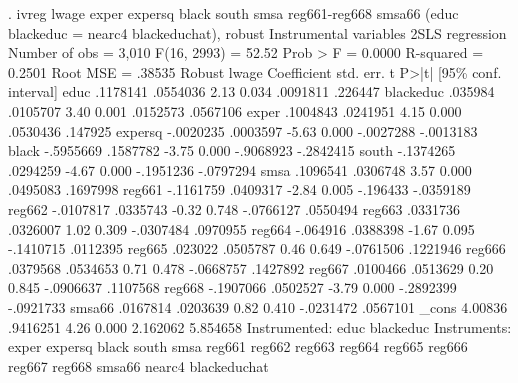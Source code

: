 . ivreg lwage exper expersq black south smsa reg661-reg668 smsa66 (educ blackeduc = nearc4 blackeduchat), robust
{\smallskip}
Instrumental variables 2SLS regression          Number of obs     =      3,010
                                                F(16, 2993)       =      52.52
                                                Prob > F          =     0.0000
                                                R-squared         =     0.2501
                                                Root MSE          =     .38535
{\smallskip}
             {\VBAR}               Robust
       lwage {\VBAR} Coefficient  std. err.      t    P>|t|     [95\% conf. interval]
        educ {\VBAR}   .1178141   .0554036     2.13   0.034     .0091811     .226447
   blackeduc {\VBAR}    .035984   .0105707     3.40   0.001     .0152573    .0567106
       exper {\VBAR}   .1004843   .0241951     4.15   0.000     .0530436     .147925
     expersq {\VBAR}  -.0020235   .0003597    -5.63   0.000    -.0027288   -.0013183
       black {\VBAR}  -.5955669   .1587782    -3.75   0.000    -.9068923   -.2842415
       south {\VBAR}  -.1374265   .0294259    -4.67   0.000    -.1951236   -.0797294
        smsa {\VBAR}   .1096541   .0306748     3.57   0.000     .0495083    .1697998
      reg661 {\VBAR}  -.1161759   .0409317    -2.84   0.005     -.196433   -.0359189
      reg662 {\VBAR}  -.0107817   .0335743    -0.32   0.748    -.0766127    .0550494
      reg663 {\VBAR}   .0331736   .0326007     1.02   0.309    -.0307484    .0970955
      reg664 {\VBAR}   -.064916   .0388398    -1.67   0.095    -.1410715    .0112395
      reg665 {\VBAR}    .023022   .0505787     0.46   0.649    -.0761506    .1221946
      reg666 {\VBAR}   .0379568   .0534653     0.71   0.478    -.0668757    .1427892
      reg667 {\VBAR}   .0100466   .0513629     0.20   0.845    -.0906637    .1107568
      reg668 {\VBAR}  -.1907066   .0502527    -3.79   0.000    -.2892399   -.0921733
      smsa66 {\VBAR}   .0167814   .0203639     0.82   0.410    -.0231472    .0567101
       _cons {\VBAR}    4.00836   .9416251     4.26   0.000     2.162062    5.854658
Instrumented: educ blackeduc
 Instruments: exper expersq black south smsa reg661 reg662 reg663 reg664
              reg665 reg666 reg667 reg668 smsa66 nearc4 blackeduchat
{\smallskip}
